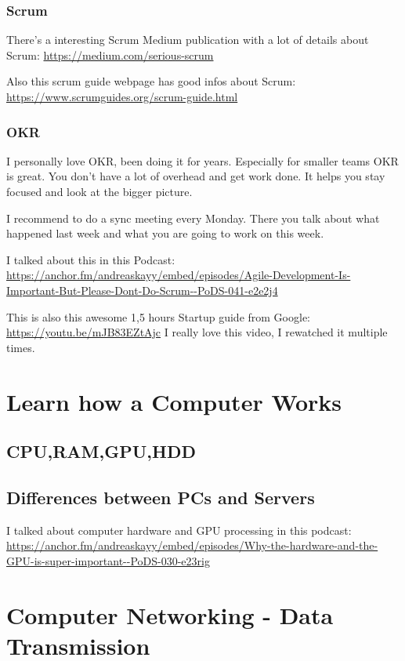 \documentclass[12pt, numbers=noenddot]{scrreprt} %
\begin{document}
\subsection{Scrum}

There's a interesting Scrum Medium publication with a lot of details about Scrum: \url{https://medium.com/serious-scrum}

Also this scrum guide webpage has good infos about Scrum: \url{https://www.scrumguides.org/scrum-guide.html}

\subsection{OKR}

I personally love OKR, been doing it for years. Especially for smaller teams OKR is great. You don't have a lot of overhead and get work done.
It helps you stay focused and look at the bigger picture. 

I recommend to do a sync meeting every Monday. There you talk about what happened last week and what you are going to work on this week.

I talked about this in this Podcast: \url{https://anchor.fm/andreaskayy/embed/episodes/Agile-Development-Is-Important-But-Please-Dont-Do-Scrum--PoDS-041-e2e2j4}

This is also this awesome 1,5 hours Startup guide from Google: \url{https://youtu.be/mJB83EZtAjc} I really love this video, I rewatched it multiple times.

 \chapter{Learn how a Computer Works}

\section{CPU,RAM,GPU,HDD}

\section{Differences between PCs and Servers}

I talked about computer hardware and GPU processing in this podcast: \url{https://anchor.fm/andreaskayy/embed/episodes/Why-the-hardware-and-the-GPU-is-super-important--PoDS-030-e23rig}

\chapter{Computer Networking - Data Transmission}
\end{document}

